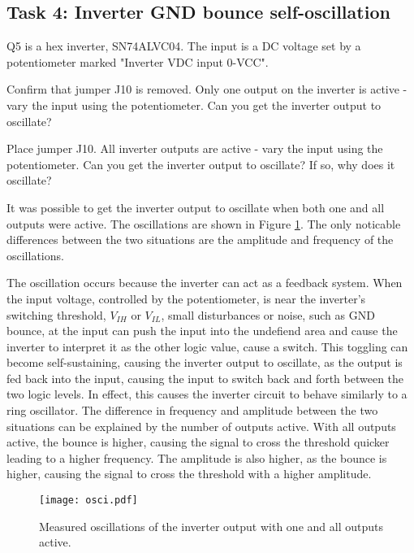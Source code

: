 \documentclass[../main.tex]{subfiles}
\begin{document}
\newpage

\subsection{Task 4: Inverter GND bounce self-oscillation}

Q5 is a hex inverter, SN74ALVC04. The input is a DC voltage set by a potentiometer marked "Inverter VDC input 0-VCC".

\vspace{10pt}

Confirm that jumper J10 is removed. Only one output on the inverter is active - vary the input using the potentiometer. Can you get the inverter output to oscillate?

\vspace{10pt}

Place jumper J10. All inverter outputs are active - vary the input using the potentiometer. Can you get the inverter output to oscillate? If so, why does it oscillate?

\solution

It was possible to get the inverter output to oscillate when both one and all outputs were active. The oscillations are shown in Figure \ref{fig:inverter_oscillation}. The only noticable differences between the two situations are the amplitude and frequency of the oscillations.

The oscillation occurs because the inverter can act as a feedback system. When the input voltage, controlled by the potentiometer, is near the inverter's switching threshold, $V_{IH}$ or $V_{IL}$, small disturbances or noise, such as GND bounce, at the input can push the input into the undefiend area and cause the inverter to interpret it as the other logic value, cause a switch. This toggling can become self-sustaining, causing the inverter output to oscillate, as the output is fed back into the input, causing the input to switch back and forth between the two logic levels. In effect, this causes the inverter circuit to behave similarly to a ring oscillator. The difference in frequency and amplitude between the two situations can be explained by the number of outputs active. With all outputs active, the bounce is higher, causing the signal to cross the threshold quicker leading to a higher frequency. The amplitude is also higher, as the bounce is higher, causing the signal to cross the threshold with a higher amplitude.

\begin{figure}[h]
    \centering
    \texttt{[image: osci.pdf]}
    \caption{Measured oscillations of the inverter output with one and all outputs active.}
    \label{fig:inverter_oscillation}
\end{figure}
\end{document}

